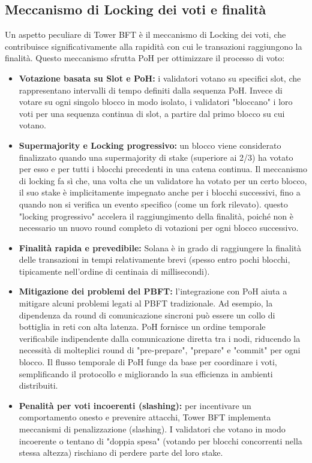 \documentclass[a4paper,12pt]{report}
\begin{document}
	\subsection{Meccanismo di Locking dei voti e finalità}
	Un aspetto peculiare di Tower BFT è il meccanismo di Locking dei voti, che contribuisce significativamente alla rapidità con cui le transazioni raggiungono la finalità. Questo meccanismo sfrutta PoH per ottimizzare il processo di voto:
	\begin{itemize}
		\item \textbf{Votazione basata su Slot e PoH:} i validatori votano su specifici slot, che rappresentano intervalli di tempo definiti dalla sequenza PoH. Invece di votare su ogni singolo blocco in modo isolato, i validatori "bloccano" i loro voti per una sequenza continua di slot, a partire dal primo blocco su cui votano.
		\item \textbf{Supermajority e Locking progressivo:} un blocco viene considerato finalizzato quando una supermajority di stake (superiore ai 2/3) ha votato per esso e per tutti i blocchi precedenti in una catena continua. Il meccanismo di locking fa sì che, una volta che un validatore ha votato per un certo blocco, il suo stake è implicitamente impegnato anche per i blocchi successivi, fino a quando non si verifica un evento specifico (come un fork rilevato). questo "locking progressivo" accelera il raggiungimento della finalità, poiché non è necessario un nuovo round completo di votazioni per ogni blocco successivo.
		\item \textbf{Finalità rapida e prevedibile:} Solana è in grado di raggiungere la finalità delle transazioni in tempi relativamente brevi (spesso entro pochi blocchi, tipicamente nell'ordine di centinaia di millisecondi).
		\item \textbf{Mitigazione dei problemi del PBFT:} l'integrazione con PoH aiuta a mitigare alcuni problemi legati al PBFT tradizionale. Ad esempio, la dipendenza da round di comunicazione sincroni può essere un collo di bottiglia in reti con alta latenza. PoH fornisce un ordine temporale verificabile indipendente dalla comunicazione diretta tra i nodi, riducendo la necessità di molteplici round di "pre-prepare", "prepare" e "commit" per ogni blocco. Il flusso temporale di PoH funge da base per coordinare i voti, semplificando il protocollo e migliorando la sua efficienza in ambienti distribuiti.
		\item \textbf{Penalità per voti incoerenti (slashing):} per incentivare un comportamento onesto e prevenire attacchi, Tower BFT implementa meccanismi di penalizzazione (slashing). I validatori che votano in modo incoerente o tentano di "doppia spesa" (votando per blocchi concorrenti nella stessa altezza) rischiano di perdere parte del loro stake.
	\end{itemize}
	
\end{document}
